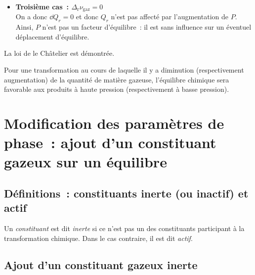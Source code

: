 \documentclass{article}
\newcommand{\Dr}{\Delta_{\mathrm{r}}}
\newcommand{\gaz}{\text{gaz}}
\begin{document}
\begin{enumerate}[label={\textsf{\textbf{\roman*)}}}]
\begin{tableau}
\begin{itemize}[label=\textbullet]
                    \item \textbf{Troisième cas~: $\Dr \nu_{\gaz} =0$}\\
                    On a donc $\dd{Q_r} =0$ et donc $Q_r$ n'est pas affecté par l'augmentation de $P$. Ainsi, $P$ n'est pas un facteur d'équilibre~: il est sans influence sur un éventuel déplacement d'équilibre.
                \end{itemize}
                La loi de le Châtelier est démontrée.
            \end{tableau}
            \begin{important}[Conséquence]
                Pour une transformation au cours de laquelle il y a diminution (respectivement augmentation) de la quantité de matière gazeuse, l’équilibre chimique sera favorable aux produits à haute pression (respectivement à basse pression).
            \end{important}
        \end{enumerate}

\section{Modification des paramètres de phase~: ajout d’un constituant gazeux sur un équilibre}
\subsection{Définitions~: constituants inerte (ou inactif) et actif}
\begin{enonce}
    Un \textit{constituant} est dit \textit{inerte} si ce n’est pas un des constituants participant à la transformation chimique. Dans le cas contraire, il est dit \textit{actif}.
\end{enonce}
\subsection{Ajout d’un constituant gazeux inerte}
\end{document}
